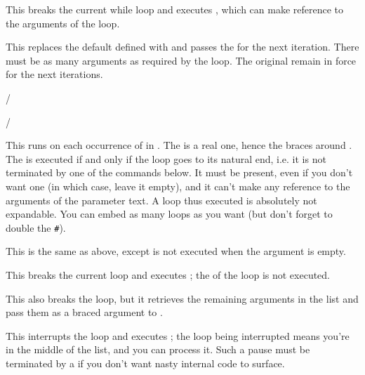 This breaks the current while loop and executes , which can make
reference to the arguments of the loop.

This replaces the default  defined with \com\newwhile
and passes the  for the next iteration. There
must be as many arguments as required by the loop. The original
 remain in force for the next iterations.

\Example
\newwhile{}
\par
{}
\Example/


\description/





This runs  on each occurrence of 
 in . The 
is a real one, hence the braces around .
The  is executed if and only if the loop goes
to its natural end, i.e. it is not terminated by one of
the commands below. It must be present, even if you don't
want one (in which case, leave it empty), and it can't make
any reference to the arguments of the parameter text.
A loop thus executed is absolutely
not expandable. You can embed as many loops as you want
(but don't forget to double the \verb/#/).

\cslist{
  \dofornoempty
  }
This is the same as above, except  is not executed
when the  argument is empty.


This breaks the current loop and executes ;
the  of the loop is not executed.

This also breaks the loop, but it retrieves the remaining
arguments in the list and pass them as a braced argument
to .

This interrupts the loop and executes ; the loop
being interrupted means you're in the middle of the list, and
you can process it. Such a pause must be terminated by a
\com\resumefor if you don't want nasty internal code
to surface.

